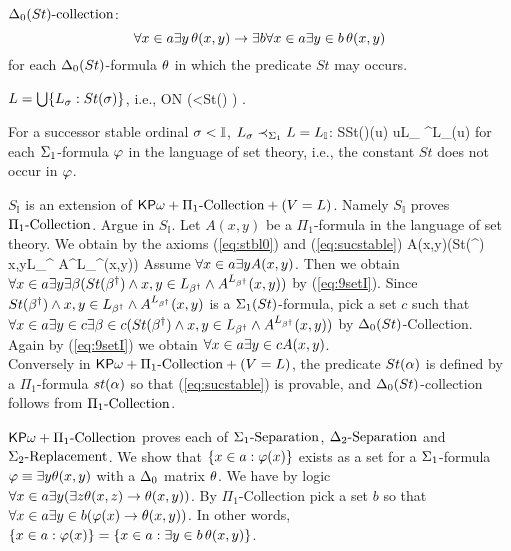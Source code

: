 \documentclass{article}
\newcommand{\mI}{\mathbb{I}}
\begin{document}
\item
$\Delta_{0}(St)\mbox{-collection}$:
\[
\forall x\in a\exists y\, \theta(x,y) \to \exists b
\forall x\in a \exists y\in b\, \theta(x,y)
\]
for each $\Delta_{0}(St)$-formula $\theta$ in which the predicate $St$ may occurs.




\item
$L=\bigcup\{L_{\sigma}: St(\sigma)\}$, i.e.,
\beqn\label{eq:stbl0}
\fal \alp\in ON \exi \sig \left(\alp<\sig \land St(\sig) \right)
\eeqn.

\item 
For a successor stable ordinal $\sig<\mI$, $L_{\sig}\prec_{\Sig_{1}}L=L_{\mI}$:
\beqn\label{eq:sucstable}
SSt(\sig)\land \vphi(u) \land u\in L_{\sig} \to \vphi^{L_{\sig}}(u)
\eeqn
for each $\Sigma_{1}$-formula $\varphi$ in the language of set theory, i.e., the constant $St$ does not occur in $\varphi$. 


\eenu





\blem\label{lem:9setI}
$S_{\mI}$ is an extension of ${\sf KP}\omega+\Pi_{1}\mbox{{\rm -Collection}}+(V=L)$.
Namely $S_{\mI}$ proves $\Pi_{1}\mbox{{\rm -Collection}}$.
\elem
\bprf
Argue in $S_{\mI}$.
Let $A(x,y)$ be a $\Pi_{1}$-formula in the language of set theory.
We obtain by the axioms (\ref{eq:stbl0}) 
and (\ref{eq:sucstable})
\beqn\label{eq:9setI}
A(x,y)\lrarw\exi \bet(St(\bet^{\dagger}) \land x,y\in L_{\bet^{\dagger}} \land A^{L_{\bet^{\dagger}}}(x,y))
\eeqn
Assume $\forall x\in a\exists yA(x,y)$. 
Then we obtain
$\forall x\in a\exists y\exists \beta (St(\beta^{\dagger}) \land x,y\in L_{\beta^{\dagger}} \land A^{L_{\beta^{\dagger}}}(x,y))$ by (\ref{eq:9setI}).
 Since $St(\beta^{\dagger})\land x,y\in L_{\beta^{\dagger}} \land A^{L_{\beta^{\dagger}}}(x,y)$ is a $\Sigma_{1}(St)$-formula,
pick a set $c$ such that 
$\forall x\in a\exists y\in c\exists \beta\in c(St(\beta^{\dagger})\land x,y\in L_{\beta^{\dagger}} \land A^{L_{\beta^{\dagger}}}(x,y))$
by $\Delta_{0}(St)$-Collection.
Again by (\ref{eq:9setI}) we obtain $\forall x\in a\exists y\in c A(x,y)$.
\eprf
\\

Conversely in ${\sf KP}\omega+\Pi_{1}\mbox{{\rm -Collection}}+(V=L)$,
the predicate $St(\alpha)$ is defined by a $\Pi_{1}$-formula $st(\alpha)$ so that
(\ref{eq:sucstable}) is provable, and $\Delta_{0}(St)$-collection follows from
$\Pi_{1}\mbox{{\rm -Collection}}$.

\blem\label{lem:9Sep}
${\sf KP}\omega+\Pi_{1}\mbox{{\rm -Collection}}$ proves each of
$\Sigma_{1}\mbox{{\rm -Separation}}$,
$\Delta_{2}\mbox{{\rm -Separation}}$ and
$\Sigma_{2}\mbox{{\rm -Replacement}}$.
\elem
\bprf
We show that $\{x\in a:\varphi(x)\}$ exists as a set for a $\Sigma_{1}$-formula $\varphi\equiv \exists y\theta(x,y)$ 
with a $\Delta_{0}$ matrix $\theta$. 
We have by logic $\forall x\in a\exists y(\exists z\theta(x,z)\rightarrow \theta(x,y))$.
By $\Pi_{1}$-Collection pick a set $b$ so that
$\forall x\in a\exists y\in b(\varphi(x)\rightarrow \theta(x,y))$.
In other words,
$\{x\in a:\varphi(x)\}=\{x\in a: \exists y\in b\, \theta(x,y)\}$.
\eprf
\\
\end{document}
